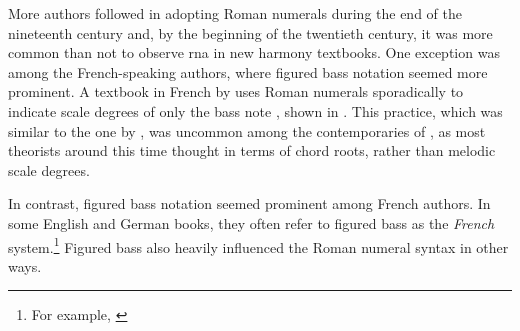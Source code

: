 

More authors followed in adopting Roman numerals during the
end of the nineteenth century and, by the beginning of the
twentieth century, it was more common than not to observe
\gls{rna} in new harmony textbooks. One exception was among
the French-speaking authors, where figured bass notation
seemed more prominent. A textbook in French by
\textcite{koechlin1928traite} uses Roman numerals
sporadically to indicate scale degrees of only the bass note
\textcite{koechlin1928traite}, shown in
. This
practice, which was similar to the one by
\textcite{hamilton1840catechism}, was uncommon among the
contemporaries of \textcite{koechlin1928traite}, as most
theorists around this time thought in terms of chord roots,
rather than melodic scale degrees.


In contrast, figured bass notation seemed prominent among
French authors. In some English and German books, they often
refer to figured bass as the \emph{French}
system.\footnote{For example,
\textcite{norris1894practical}} Figured bass also heavily
influenced the Roman numeral syntax in other ways.
